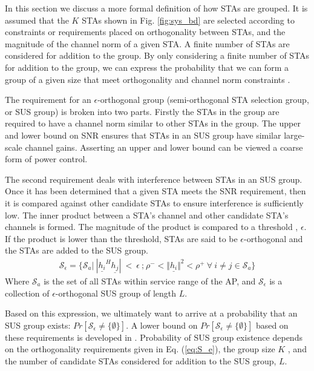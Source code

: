 In this section we discuss a more formal definition of how STAs are grouped. It is assumed that the $K$ STAs shown in Fig. \ref{fig:sys_bd} are selected according to constraints or requirements placed on orthogonality between STAs, and the magnitude of the channel norm of a given STA. A finite number of STAs are considered for addition to the group. By only considering a finite number of STAs for addition to the group, we can express the probability that we can form a group of a given size that meet orthogonality and channel norm constraints \cite{Swannack2005}. 

The requirement for an $\epsilon$-orthogonal group (semi-orthogonal STA selection group, or SUS group) is broken into two parts. Firstly the STAs in the group are required to have a channel norm similar to other STAs in the group. The upper and lower bound on SNR ensures that STAs in an SUS group have similar large-scale channel gains. Asserting an upper and lower bound can be viewed a coarse form of power control. 

The second requirement deals with interference between STAs in an SUS group. Once it has been determined that a given STA meets the SNR requirement, then it is compared against other candidate STAs to ensure interference is sufficiently low. The inner product between a STA's channel and other candidate STA's channels is formed. The magnitude of the product is compared to a threshold , $\epsilon$. If the product is lower than the threshold, STAs are said to be $\epsilon$-orthogonal and the STAs are added to the SUS group.
 \begin{equation}\label{eq:S_e}
    \begin{aligned}
        \mathcal{S}_\epsilon = \lbrace \mathcal{S}_a \big|\ | \underline{h_i}^H\underline{h_j} |\ <\ \epsilon \ \text{;} \ \rho^-<\Vert \underline{h_i} \Vert^2 < \rho^+\ \forall \ i \neq j \in \mathcal{S}_a \rbrace
    \end{aligned}
\end{equation}
Where $\mathcal{S}_a$ is the set of all STAs within service range of the AP, and $\mathcal{S}_\epsilon$ is a collection of $\epsilon$-orthogonal SUS group of length $L$.

Based on this expression, we ultimately want to arrive at a probability that an SUS group exists: $Pr[\mathcal{S}_\epsilon \neq \lbrace \emptyset \rbrace]$. A lower bound on $Pr[\mathcal{S}_\epsilon \neq \lbrace \emptyset \rbrace]$ based on these requirements is developed in \cite{Swannack2005}. Probability of SUS group existence depends on the orthogonality requirements given in Eq. (\ref{eq:S_e}), the group size $K$ , and the number of candidate STAs considered for addition to the SUS group, $L$. 

